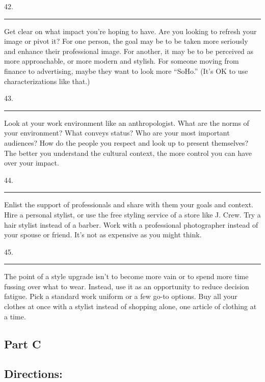 \documentclass[UTF8,11pt]{ctexart}
\begin{document}
42. \par\noindent\rule{.95\linewidth}{.4pt}\par


Get clear on what impact you’re hoping to have. Are you looking to refresh your image or pivot it? For one person, the goal may be to be taken more seriously and enhance their professional image. For another, it may be to be perceived as more approachable, or more modern and stylish. For someone moving from finance to advertising, maybe they want to look more “SoHo.” (It’s OK to use characterizations like that.)


43. \par\noindent\rule{.95\linewidth}{.4pt}\par


Look at your work environment like an anthropologist. What are the norms of your environment? What conveys status? Who are your most important audiences? How do the people you respect and look up to present themselves? The better you understand the cultural context, the more control you can have over your impact.


44. \par\noindent\rule{.95\linewidth}{.4pt}\par


Enlist the support of professionals and share with them your goals and context. Hire a personal stylist, or use the free styling service of a store like J. Crew. Try a hair stylist instead of a barber. Work with a professional photographer instead of your spouse or friend. It’s not as expensive as you might think.


45. \par\noindent\rule{.95\linewidth}{.4pt}\par


The point of a style upgrade isn’t to become more vain or to spend more time fussing over what to wear. Instead, use it as an opportunity to reduce decision fatigue. Pick a standard work uniform or a few go-to options. Buy all your clothes at once with a stylist instead of shopping alone, one article of clothing at a time.


\subsection*{\textbf{Part C}}


\subsection*{\textbf{Directions:}}
\end{document}
